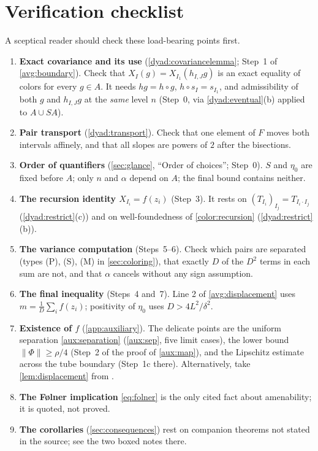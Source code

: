 \documentclass[11pt]{article}
\newcommand{\norm}[1]{\lVert #1\rVert}
\theoremstyle{definition}
\numberwithin{equation}{section}
\begin{document}
\section*{Verification checklist}

A sceptical reader should check these load-bearing points first.
\begin{enumerate}
\item \textbf{Exact covariance and its use} (\cref{dyad:covariancelemma};
Step~1 of \cref{avg:boundary}). Check that \(X_I(g)=X_{I_1}(h_{I,J}g)\) is an
exact equality of colors for every \(g\in A\). It needs \(hg=h\circ g\),
\(h\circ s_I=s_{I_1}\), and admissibility of both \(g\) and \(h_{I,J}g\) at
the \emph{same} level \(n\) (Step~0, via \cref{dyad:eventual}(b) applied to
\(A\cup SA\)).
\item \textbf{Pair transport} (\cref{dyad:transport}). Check that one element
of \(F\) moves both intervals affinely, and that all slopes are powers of
\(2\) after the bisections.
\item \textbf{Order of quantifiers} (\cref{sec:glance}, ``Order of choices'';
Step~0). \(S\) and \(\eta_0\) are fixed before \(A\); only \(n\) and
\(\alpha\) depend on \(A\); the final bound contains neither.
\item \textbf{The recursion identity \(X_{I_i}=f(z_i)\)} (Step~3). It rests
on \((T_{I_i})_{I_j}=T_{I_i\cdot I_j}\) (\cref{dyad:restrict}(c)) and on
well-foundedness of \eqref{color:recursion} (\cref{dyad:restrict}(b)).
\item \textbf{The variance computation} (Steps~5--6). Check which pairs are
separated (types (P), (S), (M) in \cref{sec:coloring}), that exactly \(D\) of
the \(D^2\) terms in each sum are not, and that \(\alpha\) cancels without
any sign assumption.
\item \textbf{The final inequality} (Steps~4 and~7). Line 2 of
\eqref{avg:displacement} uses \(m=\frac1D\sum_if(z_i)\); positivity of
\(\eta_0\) uses \(D>4L^2/\delta^2\).
\item \textbf{Existence of \(f\)} (\cref{app:auxiliary}). The delicate points
are the uniform separation \eqref{aux:separation} (\cref{aux:sep}, five limit
cases), the lower bound \(\norm{\Phi}\ge\rho/4\) (Step~2 of the proof of
\cref{aux:map}), and the Lipschitz estimate across the tube boundary (Step~1c
there). Alternatively, take \cref{lem:displacement} from
\cite{BenyaminiSternfeld1983}.
\item \textbf{The F\o lner implication} \eqref{eq:folner} is the only cited
fact about amenability; it is quoted, not proved.
\item \textbf{The corollaries} (\cref{sec:consequences}) rest on companion
theorems not stated in the source; see the two boxed notes there.
\end{enumerate}



\end{document}

